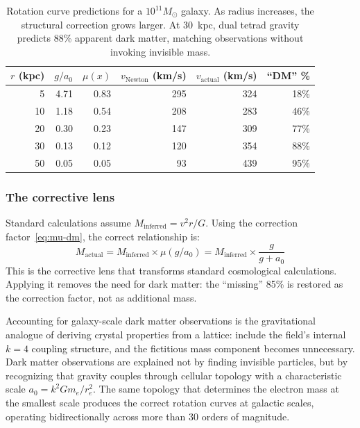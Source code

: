 \documentclass[aps,prd,preprint,superscriptaddress,showpacs,preprintnumbers,amsmath,amssymb,nofootinbib]{revtex4-2}
\begin{document}
\begin{table}[H]
\centering
\begin{tabular*}{\textwidth}{@{\extracolsep{\fill}} rrrrrr @{}}
\toprule
$r$ (kpc) & $g/a_0$ & $\mu(x)$ & $v_{\text{Newton}}$ (km/s) & $v_{\text{actual}}$ (km/s) & ``DM'' \% \\
\midrule
5 & 4.71 & 0.83 & 295 & 324 & 18\% \\
10 & 1.18 & 0.54 & 208 & 283 & 46\% \\
20 & 0.30 & 0.23 & 147 & 309 & 77\% \\
30 & 0.13 & 0.12 & 120 & 354 & 88\% \\
50 & 0.05 & 0.05 & 93 & 439 & 95\% \\
\bottomrule
\end{tabular*}
\caption{Rotation curve predictions for a $10^{11} M_\odot$ galaxy. As radius increases, the structural correction grows larger. At 30~kpc, dual tetrad gravity predicts 88\% apparent dark matter, matching observations without invoking invisible mass.}
\label{tab:darkmatter}
\end{table}

\subsubsection*{The corrective lens}

Standard calculations assume $M_{\text{inferred}} = v^2 r / G$. Using the correction factor~\eqref{eq:mu-dm}, the correct relationship is:
\begin{equation}
M_{\text{actual}} = M_{\text{inferred}} \times \mu(g/a_0) = M_{\text{inferred}} \times \frac{g}{g + a_0}
\label{eq:corrective-lens}
\end{equation}
This is the corrective lens that transforms standard cosmological calculations. Applying it removes the need for dark matter: the ``missing'' 85\% is restored as the correction factor, not as additional mass.

Accounting for galaxy-scale dark matter observations is the gravitational analogue of deriving crystal properties from a lattice: include the field's internal $k = 4$ coupling structure, and the fictitious mass component becomes unnecessary. Dark matter observations are explained not by finding invisible particles, but by recognizing that gravity couples through cellular topology with a characteristic scale $a_0 = k^2 G m_e / r_e^2$. The same topology that determines the electron mass at the smallest scale produces the correct rotation curves at galactic scales, operating bidirectionally across more than 30 orders of magnitude.
\end{document}

